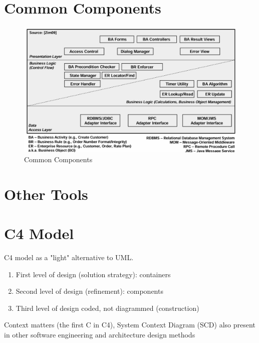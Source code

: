 \documentclass[../Main.tex]{subfiles}
\begin{document}
\section{Common Components}
\begin{figure}[H]
    \centering
    \includegraphics{Images/commoncomponents.png}
    \caption{Common Components}
    \label{fig:commoncomponents}
\end{figure}

\section{Other Tools}
\section{C4 Model}
C4 model as a "light" alternative to UML. 
\begin{enumerate}
    \item First level of design (solution strategy): containers
    \item Second level of design (refinement): components
    \item Third level of design coded, not diagrammed (construction)
\end{enumerate}

Context matters (the first C in C4), System Context Diagram (SCD) also present in other software engineering and architecture design methods
\end{document}
